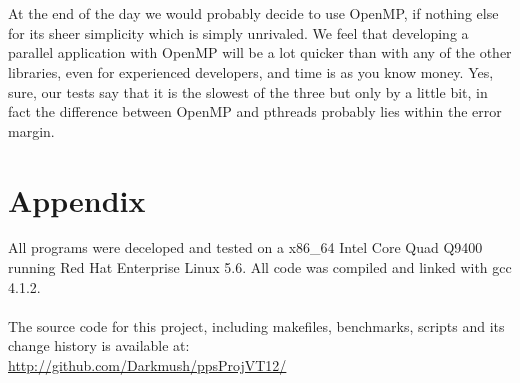 \documentclass[11pt,a4paper]{article}
\begin{document}
\\
\\
At the end of the day we would probably decide to use OpenMP, if nothing else for its sheer simplicity which is simply unrivaled. We feel that developing a parallel application with OpenMP will be a lot quicker than with any of the other libraries, even for experienced developers, and time is as you know money. Yes, sure, our tests say that it is the slowest of the three but only by a little bit, in fact the difference between OpenMP and pthreads probably lies within the error margin.
\newpage
\thispagestyle{empty}
\section*{Appendix}
All programs were deceloped and tested on a x86\_64 Intel Core Quad Q9400 running Red Hat Enterprise Linux 5.6. All code was compiled and linked with gcc 4.1.2.
\\
\\
The source code for this project, including makefiles, benchmarks, scripts and its change history is available at: \\
\url{http://github.com/Darkmush/ppsProjVT12/}
\end{document}
